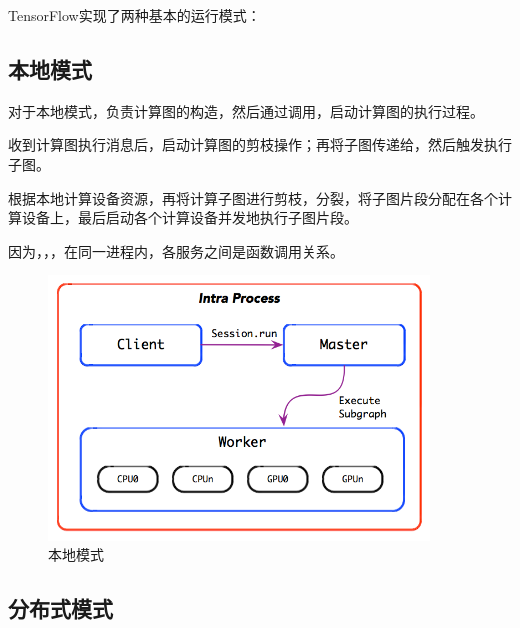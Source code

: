 \begin{content}

TensorFlow实现了两种基本的运行模式：

\begin{enum}
\end{enum}

\subsection{本地模式}

对于本地模式，负责计算图的构造，然后通过调用，启动计算图的执行过程。

收到计算图执行消息后，启动计算图的剪枝操作；再将子图传递给，然后触发执行子图。

根据本地计算设备资源，再将计算子图进行剪枝，分裂，将子图片段分配在各个计算设备上，最后启动各个计算设备并发地执行子图片段。

因为，，，在同一进程内，各服务之间是函数调用关系。

\begin{figure}[!h]
\centering
\includegraphics[width=0.9\textwidth]{figures/local.png}
\caption{本地模式}
 \label{fig:local}
\end{figure}

\subsection{分布式模式}


\end{content}
